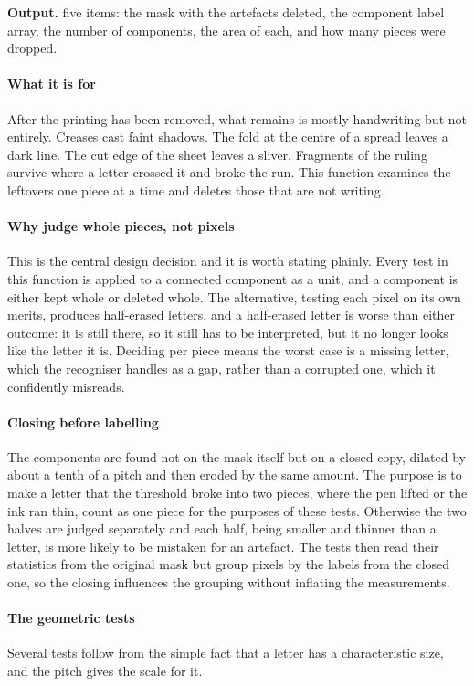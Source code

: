 \noindent\textbf{Output.} five items: the mask with the artefacts deleted, the component label array, the number of components, the area of each, and how many pieces were dropped.


\paragraph{What it is for}
After the printing has been removed, what remains is mostly handwriting but not entirely. Creases cast faint shadows. The fold at the centre of a spread leaves a dark line. The cut edge of the sheet leaves a sliver. Fragments of the ruling survive where a letter crossed it and broke the run. This function examines the leftovers one piece at a time and deletes those that are not writing.


\paragraph{Why judge whole pieces, not pixels}
This is the central design decision and it is worth stating plainly. Every test in this function is applied to a connected component as a unit, and a component is either kept whole or deleted whole. The alternative, testing each pixel on its own merits, produces half-erased letters, and a half-erased letter is worse than either outcome: it is still there, so it still has to be interpreted, but it no longer looks like the letter it is. Deciding per piece means the worst case is a missing letter, which the recogniser handles as a gap, rather than a corrupted one, which it confidently misreads.


\paragraph{Closing before labelling}
The components are found not on the mask itself but on a closed copy, dilated by about a tenth of a pitch and then eroded by the same amount. The purpose is to make a letter that the threshold broke into two pieces, where the pen lifted or the ink ran thin, count as one piece for the purposes of these tests. Otherwise the two halves are judged separately and each half, being smaller and thinner than a letter, is more likely to be mistaken for an artefact. The tests then read their statistics from the original mask but group pixels by the labels from the closed one, so the closing influences the grouping without inflating the measurements.


\paragraph{The geometric tests}
Several tests follow from the simple fact that a letter has a characteristic size, and the pitch gives the scale for it.


